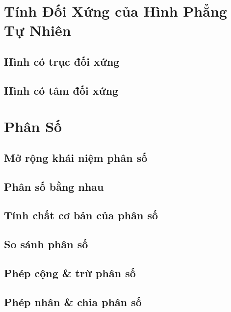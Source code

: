\documentclass{article}
\numberwithin{equation}{section}
\begin{document}

\section{Tính Đối Xứng của Hình Phẳng Tự Nhiên}

\subsection{Hình có trục đối xứng}

\subsection{Hình có tâm đối xứng}


\newpage
\section{Phân Số}

\subsection{Mở rộng khái niệm phân số}

\subsection{Phân số bằng nhau}

\subsection{Tính chất cơ bản của phân số}

\subsection{So sánh phân số}

\subsection{Phép cộng \& trừ phân số}

\subsection{Phép nhân \& chia phân số}
\end{document}
